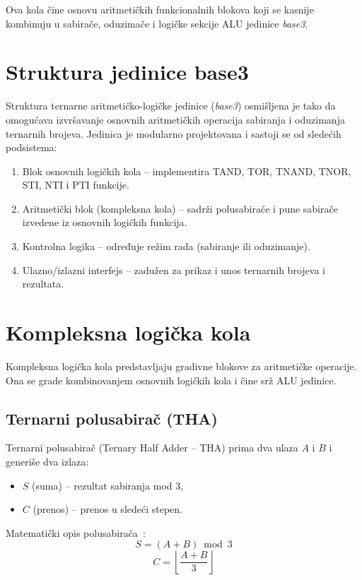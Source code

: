 \documentclass[conference,a4paper]{IEEEtran}
\begin{document}
	Ova kola čine osnovu aritmetičkih funkcionalnih blokova koji se kasnije kombinuju u sabirače, oduzimače i logičke sekcije ALU jedinice \textit{base3}.
	
	\section{Struktura jedinice base3}
	
	Struktura ternarne aritmetičko-logičke jedinice (\textit{base3}) osmišljena je tako da omogućava izvršavanje osnovnih aritmetičkih operacija sabiranja i oduzimanja ternarnih brojeva. Jedinica je modularno projektovana i sastoji se od sledećih podsistema:
	
	\begin{enumerate}
		\item Blok osnovnih logičkih kola – implementira TAND, TOR, TNAND, TNOR, STI, NTI i PTI funkcije.
		\item Aritmetički blok (kompleksna kola) – sadrži polusabirače i pune sabirače izvedene iz osnovnih logičkih funkcija.
		\item Kontrolna logika – određuje režim rada (sabiranje ili oduzimanje).
		\item Ulazno/izlazni interfejs – zadužen za prikaz i unos ternarnih brojeva i rezultata.
	\end{enumerate}
	
	\section{Kompleksna logička kola}
	
	Kompleksna logička kola predstavljaju gradivne blokove za aritmetičke operacije. Ona se grade kombinovanjem osnovnih logičkih kola i čine srž ALU jedinice.
	
	\subsection{Ternarni polusabirač (THA)}
	
	Ternarni polusabirač (Ternary Half Adder – THA) prima dva ulaza $A$ i $B$ i generiše dva izlaza:
	\begin{itemize}
		\item $S$ (suma) – rezultat sabiranja mod 3,
		\item $C$ (prenos) – prenos u sledeći stepen.
	\end{itemize}
	
	Matematički opis polusabirača~\cite{jones_arith}:
	\begin{equation}
		S = (A + B) \bmod 3
	\end{equation}
	\begin{equation}
		C = \left\lfloor \frac{A + B}{3} \right\rfloor
	\end{equation}
	
\end{document}
